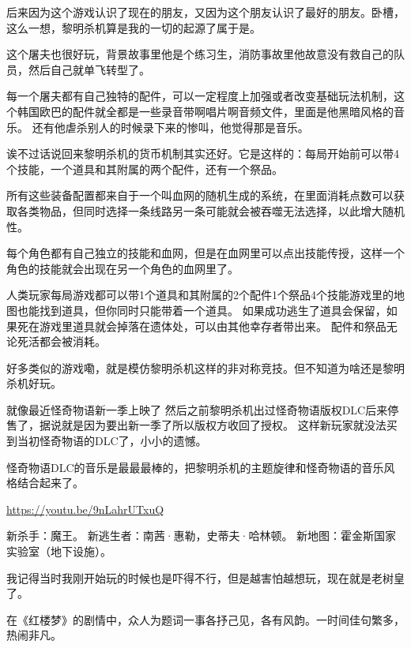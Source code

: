 后来因为这个游戏认识了现在的朋友，又因为这个朋友认识了最好的朋友。卧槽，这么一想，黎明杀机算是我的一切的起源了属于是。

这个屠夫也很好玩，背景故事里他是个练习生，消防事故里他故意没有救自己的队员，然后自己就单飞转型了。

每一个屠夫都有自己独特的配件，可以一定程度上加强或者改变基础玩法机制，这个韩国欧巴的配件就全都是一些录音带啊唱片啊音频文件，里面是他黑暗风格的音乐。
还有他虐杀别人的时候录下来的惨叫，他觉得那是音乐。

诶不过话说回来黎明杀机的货币机制其实还好。它是这样的：每局开始前可以带4个技能，一个道具和其附属的两个配件，还有一个祭品。

所有这些装备配置都来自于一个叫血网的随机生成的系统，在里面消耗点数可以获取各类物品，但同时选择一条线路另一条可能就会被吞噬无法选择，以此增大随机性。

每个角色都有自己独立的技能和血网，但是在血网里可以点出技能传授，这样一个角色的技能就会出现在另一个角色的血网里了。

人类玩家每局游戏都可以带1个道具和其附属的2个配件1个祭品4个技能游戏里的地图也能找到道具，但你同时只能带着一个道具。
如果成功逃生了道具会保留，如果死在游戏里道具就会掉落在遗体处，可以由其他幸存者带出来。
配件和祭品无论死活都会被消耗。

好多类似的游戏嘞，就是模仿黎明杀机这样的非对称竞技。但不知道为啥还是黎明杀机好玩。

就像最近怪奇物语新一季上映了 然后之前黎明杀机出过怪奇物语版权DLC后来停售了，据说就是因为要出新一季了所以版权方收回了授权。
这样新玩家就没法买到当初怪奇物语的DLC了，小小的遗憾。

怪奇物语DLC的音乐是最最最棒的，把黎明杀机的主题旋律和怪奇物语的音乐风格结合起来了。

\href{https://youtu.be/9nLahrUTxuQ}{https://youtu.be/9nLahrUTxuQ}

新杀手：魔王。
新逃生者：南茜·惠勒，史蒂夫·哈林顿。
新地图：霍金斯国家实验室（地下设施）。

我记得当时我刚开始玩的时候也是吓得不行，但是越害怕越想玩，现在就是老树皇了。










在《红楼梦》的剧情中，众人为题词一事各抒己见，各有风韵。一时间佳句繁多，热闹非凡。

